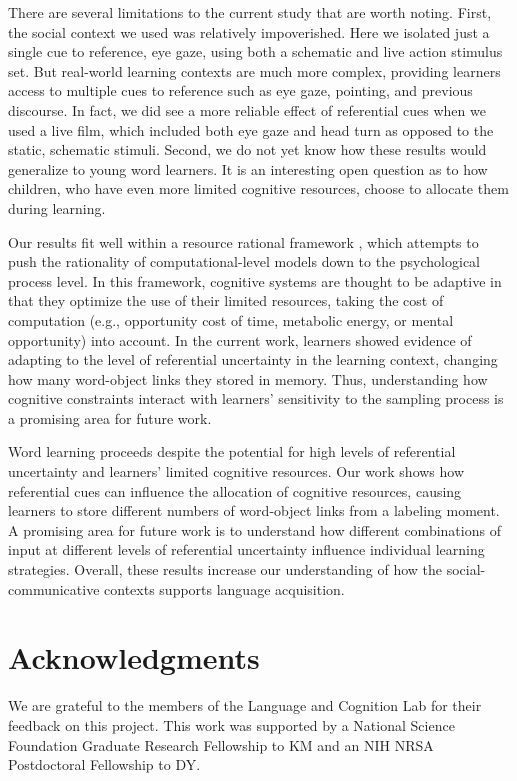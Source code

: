 \documentclass[10pt,letterpaper]{article}
\begin{document}
There are several limitations to the current study that are worth noting. First, the social context we used was relatively impoverished. Here we isolated just a single cue to reference, eye gaze, using both a schematic and live action stimulus set. But real-world learning contexts are much more complex, providing learners access to multiple cues to reference such as eye gaze, pointing, and previous discourse. In fact, we did see a more reliable effect of referential cues when we used a live film, which included both eye gaze and head turn as opposed to the static, schematic stimuli. Second, we do not yet know how these results would generalize to young word learners. It is an interesting open question as to how children, who have even more limited cognitive resources, choose to allocate them during learning.

Our results fit well within a resource rational framework \cite{griffiths2014rational}, which attempts to push the rationality of computational-level models down to the psychological process level. In this framework, cognitive systems are thought to be adaptive in that they optimize the use of their limited resources, taking the cost of computation (e.g., opportunity cost of time, metabolic energy, or mental opportunity) into account. In the current work, learners showed evidence of adapting to the level of referential uncertainty in the learning context,  changing how many word-object links they stored in memory.  Thus, understanding how cognitive constraints interact with learners' sensitivity to the sampling process is a promising area for future work.

Word learning proceeds despite the potential for high levels of referential uncertainty and learners' limited cognitive resources. Our work shows how referential cues can influence the allocation of cognitive resources, causing learners to store different numbers of word-object links from a labeling moment. A promising area for future work is to understand how different combinations of input at different levels of referential uncertainty influence individual learning strategies. Overall, these results increase our understanding of how the social-communicative contexts supports language acquisition. 

\section{Acknowledgments}

We are grateful to the members of the Language and Cognition Lab for their feedback on this project. This work was supported by a National Science Foundation Graduate Research Fellowship to KM and an NIH NRSA Postdoctoral Fellowship to DY.




\setlength{\bibleftmargin}{.125in}
\setlength{\bibindent}{-\bibleftmargin}


\end{document}
